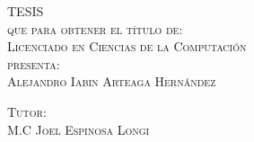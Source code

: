 \documentclass[letterpaper,12pt,oneside]{book}
\begin{document}
\begin{titlepage}
\begin{minipage}[c][0.81\textheight][t]{0.75\textwidth}
\begin{center}
                \vspace{2cm}            

                \textsc{\LARGE T\hspace{1.5cm}E\hspace{1.5cm}S\hspace{1.5cm}I\hspace{1.5cm}S}\\[0.5cm]
                \textsc{\large que para obtener el t\'itulo de:}\\[0.5cm]
                \textsc{\large Licenciado en Ciencias de la Computación}\\[0.5cm]
                \textsc{\large presenta:}\\[0.5cm]
                \textsc{\large {Alejandro Iabin Arteaga Hernández}}\\[2cm]          

                \vspace{0.5cm}

                {\large\scshape Tutor:\\[0.3cm] {M.C Joel Espinosa Longi  }}\\[.2in]

                \vspace{0.5cm}

             
            \end{center}
        \end{minipage}
    \end{titlepage}
\end{document}
